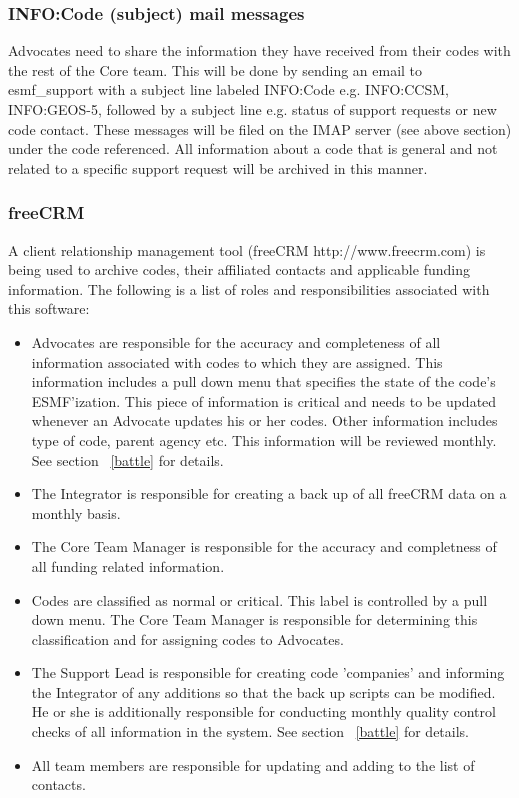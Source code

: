 \begin{enumerate}
\subsubsection{INFO:Code (subject) mail messages}
\label{infomail}

Advocates need to share the information they have received from their codes with the rest of the Core team. This will be done by sending an email to esmf\_support with a subject line labeled INFO:Code e.g. INFO:CCSM, INFO:GEOS-5, followed by a subject line e.g. status of support requests or new code contact.  These messages will be filed on the IMAP server (see above section) under the code referenced. All information about a code that is general and not related to a specific support request will be archived in this manner. 

\subsubsection{freeCRM}
A client relationship management tool (freeCRM http://www.freecrm.com) is being used to archive codes, their affiliated contacts and applicable funding information. The following is a list of roles and responsibilities associated with this software:
\begin{itemize}
\item Advocates are responsible for the accuracy and completeness of all information associated with codes to which they are assigned.  This information includes a pull down menu that specifies the state of the code's ESMF'ization. This piece of information is critical and needs to be updated whenever an Advocate updates his or her codes. Other information includes type of code, parent agency etc. This information will be reviewed monthly. See section ~\ref{battle} for details.
\item The Integrator is responsible for creating a back up of all freeCRM data on a monthly basis.
\item The Core Team Manager is responsible for the accuracy and completness of all funding related information.
\item Codes are classified as normal or critical. This label is controlled by a pull down menu. The Core Team Manager is responsible for determining this classification and for assigning codes to Advocates.
\item The Support Lead is responsible for creating code 'companies' and informing the Integrator of any additions so that the back up scripts can be modified. He or she is additionally responsible for conducting monthly quality control checks of all information in the system. See section ~\ref{battle} for details.
\item All team members are responsible for updating and adding to the list of contacts. 
\end{itemize} 


\end{enumerate}
